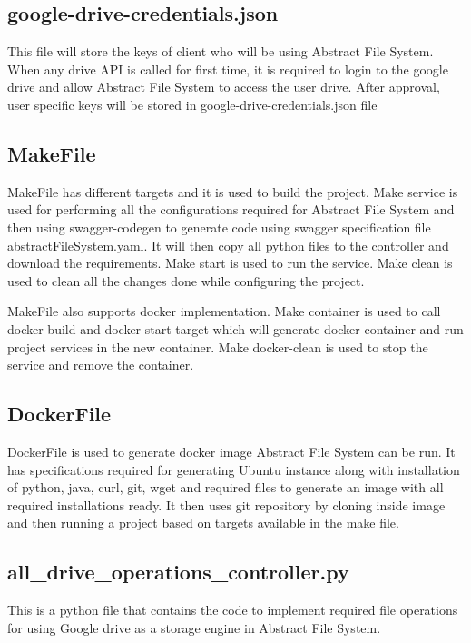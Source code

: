 \subsection{google-drive-credentials.json}
This file will store the keys of client who will be using Abstract File 
System. When any drive API is called for first time, it is required to login 
to the google drive and allow Abstract File System to access the user drive. 
After approval, user specific keys will be stored in 
google-drive-credentials.json file

\subsection{MakeFile}
MakeFile has different targets and it is used to build the project. 
Make service is used for performing all the configurations required for 
Abstract File System and then using swagger-codegen to generate code using 
swagger specification file abstractFileSystem.yaml. It will then copy all 
python files to the controller and download the requirements. Make start is 
used to run the service. Make clean is used to clean all the changes done 
while configuring the project. 


MakeFile also supports docker implementation. Make container is used to call 
docker-build and docker-start target which will generate docker container and 
run project services in the new container. Make docker-clean is used to stop 
the service and remove the container. 

\subsection{DockerFile}
DockerFile is used to generate docker image Abstract File System can be run. 
It has specifications required for generating Ubuntu instance along with 
installation of python, java, curl, git, wget and required files to generate 
an image with all required installations ready. It then uses git repository by 
cloning inside image and then running a project based on targets available in 
the make file. 

\subsection{all\_drive\_operations\_controller.py}
This is a python file that contains the code to implement required file 
operations for using Google drive as a storage engine in Abstract File System.

